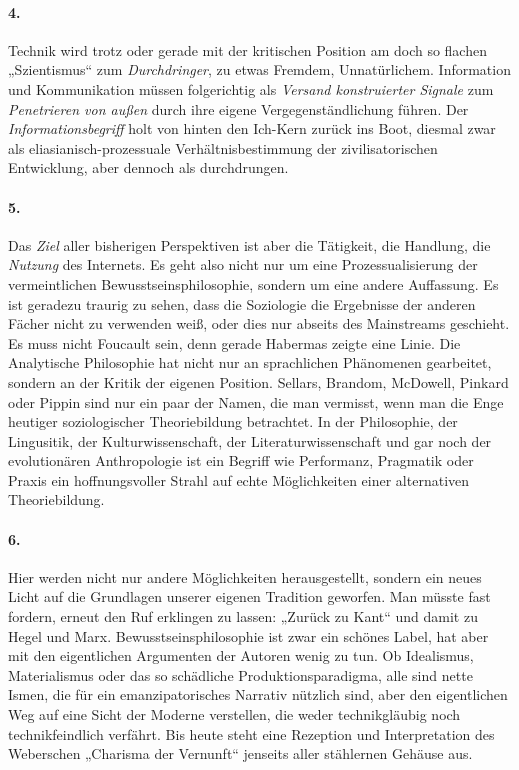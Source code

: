 \documentclass[a4paper,11pt]{article}
\begin{document}
\paragraph{4.} 
Technik wird trotz oder gerade mit der kritischen Position am doch so flachen
„Szientismus“ zum \emph{Durchdringer}, zu etwas Fremdem, Unnatürlichem.
Information und Kommunikation müssen folgerichtig als \emph{Versand
  konstruierter Signale} zum \emph{Penetrieren von außen} durch ihre eigene
Vergegenständlichung führen. Der \emph{Informationsbegriff} holt von hinten den
Ich-Kern zurück ins Boot, diesmal zwar als eliasianisch-prozessuale
Verhältnisbestimmung der zivilisatorischen Entwicklung, aber dennoch als
durchdrungen.

\paragraph{5.} 
Das \emph{Ziel} aller bisherigen Perspektiven ist aber die Tätigkeit, die
Handlung, die \emph{Nutzung} des Internets. Es geht also nicht nur um eine
Prozessualisierung der vermeintlichen Bewusstseinsphilosophie, sondern um eine
andere Auffassung. Es ist geradezu traurig zu sehen, dass die Soziologie die
Ergebnisse der anderen Fächer nicht zu verwenden weiß, oder dies nur abseits
des Mainstreams geschieht. Es muss nicht Foucault sein, denn gerade Habermas
zeigte eine Linie. Die Analytische Philosophie hat nicht nur an sprachlichen
Phänomenen gearbeitet, sondern an der Kritik der eigenen Position. Sellars,
Brandom, McDowell, Pinkard oder Pippin sind nur ein paar der Namen, die man
vermisst, wenn man die Enge heutiger soziologischer Theoriebildung betrachtet.
In der Philosophie, der Lingusitik, der Kulturwissenschaft, der
Literaturwissenschaft und gar noch der evolutionären Anthropologie ist ein
Begriff wie Performanz, Pragmatik oder Praxis ein hoffnungsvoller Strahl auf
echte Möglichkeiten einer alternativen Theoriebildung.

\paragraph{6.} 
Hier werden nicht nur andere Möglichkeiten herausgestellt, sondern ein neues
Licht auf die Grundlagen unserer eigenen Tradition geworfen. Man müsste fast
fordern, erneut den Ruf erklingen zu lassen: „Zurück zu Kant“ und damit zu
Hegel und Marx. Bewusstseinsphilosophie ist zwar ein schönes Label, hat aber
mit den eigentlichen Argumenten der Autoren wenig zu tun. Ob Idealismus,
Materialismus oder das so schädliche Produktionsparadigma, alle sind nette
Ismen, die für ein emanzipatorisches Narrativ nützlich sind, aber den
eigentlichen Weg auf eine Sicht der Moderne verstellen, die weder
technikgläubig noch technikfeindlich verfährt. Bis heute steht eine Rezeption
und Interpretation des Weberschen „Charisma der Vernunft“ jenseits aller
stählernen Gehäuse aus.
\medskip
\end{document}
